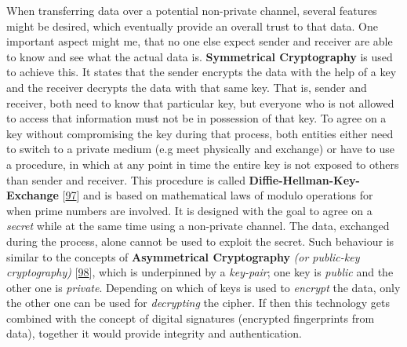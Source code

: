 \documentclass[12pt,english,a4paper,titlepage,cleardoublepage=empty,dottedtoc]{report}
\begin{document}
When transferring data over a potential non-private channel, several
features might be desired, which eventually provide an overall trust to
that data. One important aspect might me, that no one else expect sender
and receiver are able to know and see what the actual data is.
\textbf{Symmetrical Cryptography} is used to achieve this. It states
that the sender encrypts the data with the help of a key and the
receiver decrypts the data with that same key. That is, sender and
receiver, both need to know that particular key, but everyone who is not
allowed to access that information must not be in possession of that
key. To agree on a key without compromising the key during that process,
both entities either need to switch to a private medium (e.g meet
physically and exchange) or have to use a procedure, in which at any
point in time the entire key is not exposed to others than sender and
receiver. This procedure is called \textbf{Diffie-Hellman-Key-Exchange}
{[}\protect\hyperlink{ref-paper_1976_d-h-key-exchange}{97}{]} and is
based on mathematical laws of modulo operations for when prime numbers
are involved. It is designed with the goal to agree on a \emph{secret}
while at the same time using a non-private channel. The data, exchanged
during the process, alone cannot be used to exploit the secret. Such
behaviour is similar to the concepts of
\textbf{\protect\hypertarget{def--asym-crypto}{}{Asymmetrical
Cryptography}} \emph{(or public-key cryptography)}
{[}\protect\hyperlink{ref-book_2014_chapter-9-1-public-key-crypto}{98}{]},
which is underpinned by a \emph{key-pair}; one key is \emph{public} and
the other one is \emph{private}. Depending on which of keys is used to
\emph{encrypt} the data, only the other one can be used for
\emph{decrypting} the cipher. If then this technology gets combined with
the concept of digital signatures (encrypted fingerprints from data),
together it would provide integrity and authentication.
\end{document}
